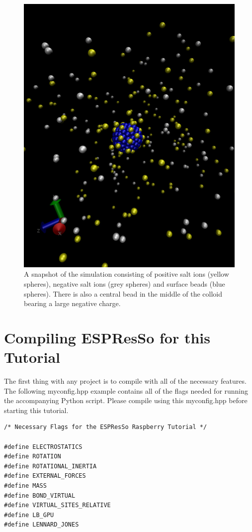 \documentclass[
paper=a4,                       %
fontsize=11pt,                  %
twoside,                        %
footsepline,                    %
headsepline,                    %
headinclude=false,              %
footinclude=false,              %
pagesize,                       %
]{scrartcl}
\begin{document}
\begin{figure}[]
	\centering
	\includegraphics[width=\linewidth]{figures/raspberry_snapshot}
	\caption{A snapshot of the simulation consisting of positive salt ions (yellow spheres), negative salt ions (grey spheres) and surface beads (blue spheres). There is also a central bead in the middle of the colloid bearing a large negative  charge.}
	\label{fig:rasp_snapshot}
\end{figure} 

\section{Compiling ESPResSo for this Tutorial}\label{sec:compiler_flags}
The first thing with any \es{} project is to compile \es{} with all of the necessary features.
The following myconfig.hpp example contains all of the flags needed for running the accompanying Python script.
Please compile \es{} using this myconfig.hpp before starting this tutorial.
{\small\vspace{0,2cm}
\begin{lstlisting}[numbers=none]
/* Necessary Flags for the ESPResSo Raspberry Tutorial */

#define ELECTROSTATICS
#define ROTATION
#define ROTATIONAL_INERTIA
#define EXTERNAL_FORCES
#define MASS
#define BOND_VIRTUAL
#define VIRTUAL_SITES_RELATIVE
#define LB_GPU
#define LENNARD_JONES
\end{lstlisting}\vspace{0,2cm}
}
\end{document}
